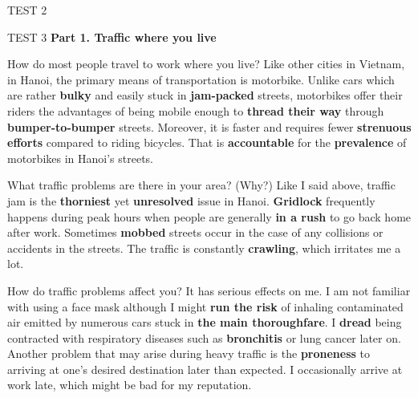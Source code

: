 \begin{glossarymc}[Cambridge 6]
\begin{test}{TEST 2}
\begin{VocabHighlights}
    \end{VocabHighlights}
    \end{test}

    \begin{test}{TEST 3}
    \noindent
    \textbf{Part 1. Traffic where you live}
    \begin{qa}{How do most people travel to work where you live?}
    Like other cities in Vietnam, in Hanoi, the primary means of transportation is motorbike. Unlike cars which are rather \textbf{bulky} and easily stuck in \textbf{jam-packed} streets, motorbikes offer their riders the advantages of being mobile enough to \textbf{thread their way} through \textbf{bumper-to-bumper} streets. Moreover, it is faster and requires fewer \textbf{strenuous efforts} compared to riding bicycles. That is \textbf{accountable} for the \textbf{prevalence} of motorbikes in Hanoi's streets.
    \end{qa}

    \begin{qa}{What traffic problems are there in your area? (Why?)}
    Like I said above, traffic jam is the \textbf{thorniest} yet \textbf{unresolved} issue in Hanoi. \textbf{Gridlock} frequently happens during peak hours when people are generally \textbf{in a rush} to go back home after work. Sometimes \textbf{mobbed} streets occur in the case of any collisions or accidents in the streets. The traffic is constantly \textbf{crawling}, which irritates me a lot.
    \end{qa}

    \begin{qa}{How do traffic problems affect you?}
    It has serious effects on me. I am not familiar with using a face mask although I might \textbf{run the risk} of inhaling contaminated air emitted by numerous cars stuck in \textbf{the main thoroughfare}. I \textbf{dread} being contracted with respiratory diseases such as \textbf{bronchitis} or lung cancer later on. Another problem that may arise during heavy traffic is the \textbf{proneness} to arriving at one's desired destination later than expected. I occasionally arrive at work late, which might be bad for my reputation.
    \end{qa}


\end{test}
\end{glossarymc}
